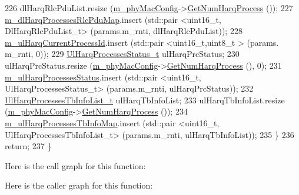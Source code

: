 \begin{DoxyCode}
226         dlHarqRlcPduList.resize (\hyperlink{classns3_1_1MmWaveMacScheduler_a24d7af4971d2e500fe543cefbafa2fd9}{m\_phyMacConfig}->\hyperlink{classns3_1_1MmWavePhyMacCommon_a40773d84172ebeb5aff125f56ebcc5ac}{GetNumHarqProcess} ());
227         \hyperlink{classns3_1_1MmWaveRrMacScheduler_a51e5c8d3c34be4e070f2fb3e621cd418}{m\_dlHarqProcessesRlcPduMap}.insert (std::pair <uint16\_t,
       DlHarqRlcPduList\_t> (params.m\_rnti, dlHarqRlcPduList));
228         \hyperlink{classns3_1_1MmWaveRrMacScheduler_a9d9d27b704770d34cb1ce158e9ed51ba}{m\_ulHarqCurrentProcessId}.insert (std::pair <uint16\_t,uint8\_t > (params.
      m\_rnti, 0));
229         \hyperlink{classns3_1_1MmWaveRrMacScheduler_aaa0e5dc99185dddba2e9617f3bc8b9bd}{UlHarqProcessesStatus\_t} ulHarqPrcStatus;
230         ulHarqPrcStatus.resize (\hyperlink{classns3_1_1MmWaveMacScheduler_a24d7af4971d2e500fe543cefbafa2fd9}{m\_phyMacConfig}->\hyperlink{classns3_1_1MmWavePhyMacCommon_a40773d84172ebeb5aff125f56ebcc5ac}{GetNumHarqProcess} (), 0);
231         \hyperlink{classns3_1_1MmWaveRrMacScheduler_af963cfe7e5dc36fce45c16d60b506465}{m\_ulHarqProcessesStatus}.insert (std::pair <uint16\_t,
       UlHarqProcessesStatus\_t> (params.m\_rnti, ulHarqPrcStatus));
232         \hyperlink{classns3_1_1MmWaveRrMacScheduler_a8be4bb7220253ad506048ff37620c7f1}{UlHarqProcessesTbInfoList\_t} ulHarqTbInfoList;
233         ulHarqTbInfoList.resize (\hyperlink{classns3_1_1MmWaveMacScheduler_a24d7af4971d2e500fe543cefbafa2fd9}{m\_phyMacConfig}->\hyperlink{classns3_1_1MmWavePhyMacCommon_a40773d84172ebeb5aff125f56ebcc5ac}{GetNumHarqProcess} ());
234         \hyperlink{classns3_1_1MmWaveRrMacScheduler_a3fb20c8b0644fdd05f5545ec0b685b10}{m\_ulHarqProcessesTbInfoMap}.insert (std::pair <uint16\_t,
       UlHarqProcessesTbInfoList\_t> (params.m\_rnti, ulHarqTbInfoList));
235   \}
236   \textcolor{keywordflow}{return};
237 \}
\end{DoxyCode}


Here is the call graph for this function\+:




Here is the caller graph for this function\+:


